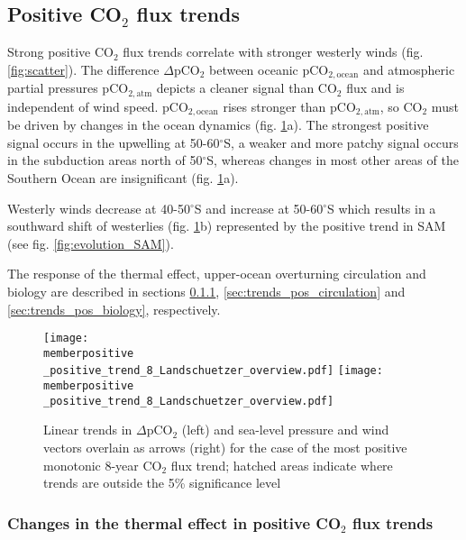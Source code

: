 \documentclass[12pt]{article}
\newcommand{\memberpositive}{m178_1985_1992} %
\begin{document}
\clearpage

\subsection{Positive CO$_2$ flux trends}
\label{sec:trends_pos}

Strong positive CO$_2$ flux trends correlate with stronger westerly winds (fig. \ref{fig:scatter}). The difference $\Delta$pCO$_2$ between oceanic pCO$_{2,\text{ocean}}$ and atmospheric partial pressures pCO$_{2,\text{atm}}$ depicts a cleaner signal than CO$_2$ flux and is independent of wind speed. pCO$_{2,\text{ocean}}$ rises stronger than pCO$_{2,\text{atm}}$, so CO$_2$ must be driven by changes in the ocean dynamics (fig. \ref{fig:pco2_pos}a).
The strongest positive signal occurs in the upwelling at 50-60$^\circ$S, a weaker and more patchy signal occurs in the subduction areas north of 50$^\circ$S, whereas changes in most other areas of the Southern Ocean are insignificant (fig. \ref{fig:pco2_pos}a). 

Westerly winds decrease at 40-50$^\circ$S and increase at 50-60$^\circ$S which results in a southward shift of westerlies (fig. \ref{fig:pco2_pos}b) represented by the positive trend in SAM (see fig. \ref{fig:evolution_SAM}). \newline


The response of the thermal effect, upper-ocean overturning circulation and biology are described in sections \ref{sec:trends_pos_thermal}, \ref{sec:trends_pos_circulation} and \ref{sec:trends_pos_biology}, respectively.


\begin{figure}[h!]
\centering
	\texttt{[image: \\memberpositive \_positive\_trend\_8\_Landschuetzer\_overview.pdf]}
	\texttt{[image: \\memberpositive \_positive\_trend\_8\_Landschuetzer\_overview.pdf]}	
	\caption{Linear trends in $\Delta$pCO$_2$ (left) and sea-level pressure and wind vectors overlain as arrows (right) for the case of the most positive monotonic 8-year CO$_2$ flux trend; hatched areas indicate where trends are outside the 5\% significance level}%
	\label{fig:pco2_pos}
\end{figure}






\clearpage

\subsubsection{Changes in the thermal effect in positive CO$_2$ flux trends}
\label{sec:trends_pos_thermal}
\end{document}

